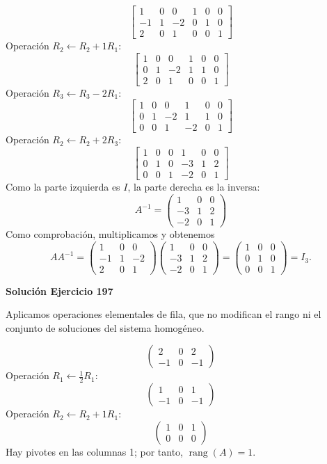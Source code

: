 \documentclass[12pt]{article}
\newcommand{\rang}{\operatorname{rang}}
\begin{document}
\[
\left[\begin{array}{rrr|rrr}1&0&0&1&0&0\\-1&1&-2&0&1&0\\2&0&1&0&0&1\end{array}\right]
\]
Operación $R_{2}\leftarrow R_{2}+1R_{1}$:
\[
\left[\begin{array}{rrr|rrr}1&0&0&1&0&0\\0&1&-2&1&1&0\\2&0&1&0&0&1\end{array}\right]
\]
Operación $R_{3}\leftarrow R_{3}-2R_{1}$:
\[
\left[\begin{array}{rrr|rrr}1&0&0&1&0&0\\0&1&-2&1&1&0\\0&0&1&-2&0&1\end{array}\right]
\]
Operación $R_{2}\leftarrow R_{2}+2R_{3}$:
\[
\left[\begin{array}{rrr|rrr}1&0&0&1&0&0\\0&1&0&-3&1&2\\0&0&1&-2&0&1\end{array}\right]
\]
Como la parte izquierda es $I$, la parte derecha es la inversa:
\[
\boxed{A^{-1}=\begin{pmatrix}1&0&0\\-3&1&2\\-2&0&1\end{pmatrix}}
\]
Como comprobación, multiplicamos y obtenemos
\[
AA^{-1}=\begin{pmatrix}1&0&0\\-1&1&-2\\2&0&1\end{pmatrix}\begin{pmatrix}1&0&0\\-3&1&2\\-2&0&1\end{pmatrix}=\begin{pmatrix}1&0&0\\0&1&0\\0&0&1\end{pmatrix}=I_{3}.
\]

\par\bigskip\noindent\textbf{Solución Ejercicio 197}\par\nobreak
Aplicamos operaciones elementales de fila, que no modifican el rango ni el conjunto de soluciones del sistema homogéneo.

\[
\begin{pmatrix}2&0&2\\-1&0&-1\end{pmatrix}
\]
Operación $R_{1}\leftarrow \frac{1}{2}R_{1}$:
\[
\begin{pmatrix}1&0&1\\-1&0&-1\end{pmatrix}
\]
Operación $R_{2}\leftarrow R_{2}+1R_{1}$:
\[
\begin{pmatrix}1&0&1\\0&0&0\end{pmatrix}
\]
Hay pivotes en las columnas 1; por tanto, $\boxed{\rang(A)=1}$.
\end{document}
